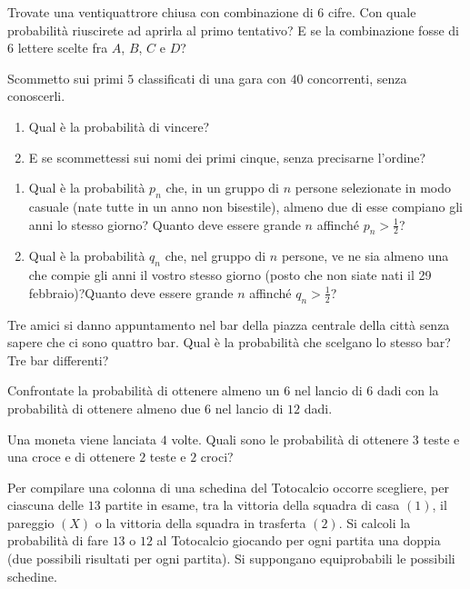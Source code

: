 \Esercizio{}

Trovate una ventiquattrore chiusa con combinazione di $6$ cifre. Con quale probabilità riuscirete ad aprirla al primo tentativo? E se la combinazione fosse di $6$ lettere scelte fra $A$, $B$, $C$ e $D$?

\Esercizio{}

Scommetto sui primi $5$ classificati di una gara con $40$ concorrenti, senza conoscerli.
\begin{enumerate}
	\item Qual è la probabilità di vincere?
	\item E se scommettessi sui nomi dei primi cinque, senza precisarne l'ordine?
\end{enumerate}


\begin{enumerate}
	\item Qual è la probabilità $p_{n}$ che, in un gruppo di $n$ persone selezionate in modo casuale (nate tutte in un anno non bisestile), almeno due di esse compiano gli anni lo stesso giorno? Quanto deve essere grande $n$ affinché $p_{n}  >\frac{1}{2}$?
	\item Qual è la probabilità $q_{n}$ che, nel gruppo di $n$ persone, ve ne sia almeno una che compie gli anni il vostro stesso giorno (posto che non siate nati il 29 febbraio)?Quanto deve essere grande $n$ affinché $q_{n}  >\frac{1}{2}$?
\end{enumerate}

\Esercizio{}

Tre amici si danno appuntamento nel bar della piazza centrale della città senza sapere che ci sono quattro bar. Qual è la probabilità che scelgano lo stesso bar? Tre bar differenti?

\Esercizio{}

Confrontate la probabilità di ottenere almeno un $6$ nel lancio di $6$ dadi con la probabilità di ottenere almeno due $6$ nel lancio di $12$ dadi.

\Esercizio{}

Una moneta viene lanciata $4$ volte. Quali sono le probabilità di ottenere $3$ teste e una croce e di ottenere $2$ teste e $2$ croci?

\Esercizio{}

Per compilare una colonna di una schedina del Totocalcio occorre scegliere, per ciascuna delle $13$ partite in esame, tra la vittoria della squadra di casa $(1)$, il pareggio $(X)$ o la vittoria della squadra in trasferta $(2)$. Si calcoli la probabilità di fare $13$ o $12$ al Totocalcio giocando per ogni partita una doppia (due possibili risultati per ogni partita). Si suppongano equiprobabili le possibili schedine.

